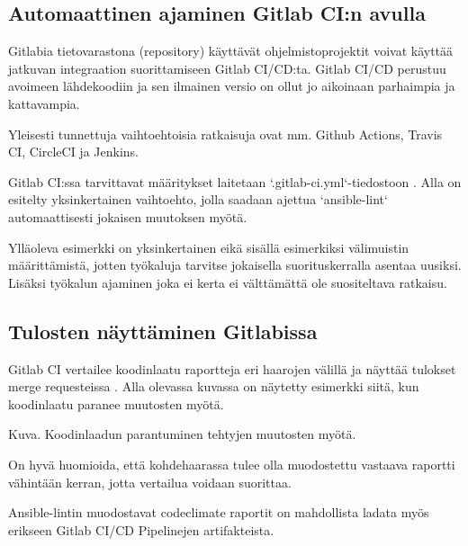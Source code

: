 \subsection{Automaattinen ajaminen Gitlab CI:n avulla}

Gitlabia tietovarastona (repository) käyttävät ohjelmistoprojektit voivat käyttää
jatkuvan integraation suorittamiseen Gitlab CI/CD:ta. Gitlab CI/CD perustuu
avoimeen lähdekoodiin ja sen ilmainen versio on ollut jo aikoinaan parhaimpia ja
kattavampia. \parencite{alma9911268330505973}

Yleisesti tunnettuja vaihtoehtoisia ratkaisuja ovat mm. Github Actions, Travis CI,
CircleCI ja Jenkins.

Gitlab CI:ssa tarvittavat määritykset laitetaan `.gitlab-ci.yml`-tiedostoon
\parencite{GitlabCICDDocs}. Alla on esitelty yksinkertainen vaihtoehto, jolla
saadaan ajettua `ansible-lint` automaattisesti jokaisen muutoksen myötä.



Ylläoleva esimerkki on yksinkertainen eikä sisällä esimerkiksi välimuistin
määrittämistä, jotten työkaluja tarvitse jokaisella suorituskerralla asentaa
uusiksi. Lisäksi työkalun ajaminen joka ei kerta ei välttämättä ole suositeltava
ratkaisu.

\subsection{Tulosten näyttäminen Gitlabissa}

Gitlab CI vertailee koodinlaatu raportteja eri haarojen välillä ja näyttää
tulokset merge requesteissa \parencite{GitlabCICDDocs}. Alla olevassa kuvassa on
näytetty esimerkki siitä, kun koodinlaatu paranee muutosten myötä.

{Kuva. Koodinlaadun parantuminen tehtyjen muutosten myötä.}

On hyvä huomioida, että kohdehaarassa tulee olla muodostettu vastaava
raportti vähintään kerran, jotta vertailua voidaan suorittaa. \parencite{GitlabCICDDocs}

Ansible-lintin muodostavat codeclimate raportit on mahdollista ladata myös
erikseen Gitlab CI/CD Pipelinejen artifakteista. \parencite{GitlabCICDDocs}
